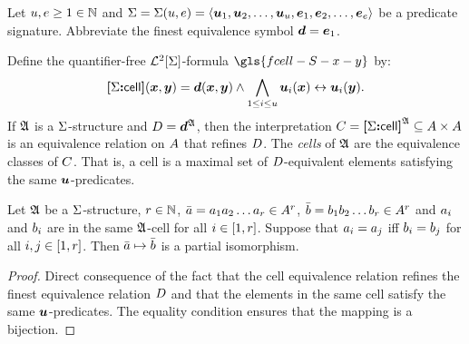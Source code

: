 
Let $u, e \geq 1 \in \mathbb{N}$ and $\mathrm{\Sigma} = \mathrm{\Sigma}(u,e) =
\left\langle \bm{u}_{1},\bm{u}_{2},\dots,\bm{u}_{u},\bm{e}_{1},\bm{e}_{2},\dots,\bm{e}_{e} \right\rangle$
be a predicate signature.
Abbreviate the finest equivalence symbol $\bm{d} = \bm{e}_{1}$.

\begin{definition}
Define the quantifier-free $\mathcal{L}^{2}[\mathrm{\Sigma}]$-formula $\gls{fcell-S-x-y}$ by:
\[
  {\bm{[}\mathrm{\Sigma}\mathord{\bm{:}}\mathsf{cell}\bm{]}}(\bm{x},\bm{y}) = \bm{d}(\bm{x},\bm{y}) \land
  \bigwedge_{1 \leq i \leq u} \bm{u}_{i}(\bm{x}) \leftrightarrow \bm{u}_{i}(\bm{y}).
\]
If $\mathfrak{A}$ is a $\mathrm{\Sigma}$-structure and $D = \bm{d}^{\mathfrak{A}}$, then the
interpretation $C = {\bm{[}\mathrm{\Sigma}\mathord{\bm{:}}\mathsf{cell}\bm{]}}^{\mathfrak{A}} \subseteq {A\times A}$ is an
equivalence relation on $A$ that refines $D$.
The \emph{cells} of $\mathfrak{A}$ are the equivalence classes of $C$.
That is, a cell is a maximal set of $D$-equivalent elements satisfying the
same $\bm{u}$-predicates.
\end{definition}

\begin{remark}\label{rem:monadic-same-cell-r}
Let $\mathfrak{A}$ be a $\mathrm{\Sigma}$-structure, $r \in \mathbb{N}$,
$\bar{a} = a_{1}a_{2}\dots a_{r} \in A^r$,
$\bar{b} = b_{1}b_{2}\dots b_{r} \in A^r$ and $a_{i}$ and $b_{i}$
are in the same $\mathfrak{A}$-cell for all $i \in [1,r]$.
Suppose that $a_{i} = a_{j}$ iff $b_{i} = b_{j}$ for all $i, j \in
[1,r]$.
Then $\bar{a} \mapsto \bar{b}$ is a partial isomorphism.
\end{remark}
\begin{proof}
Direct consequence of the fact that the cell equivalence relation refines the
finest equivalence relation $D$ and that the elements in the same cell
satisfy the same $\bm{u}$-predicates.
The equality condition ensures that the mapping is a bijection.
\end{proof}

